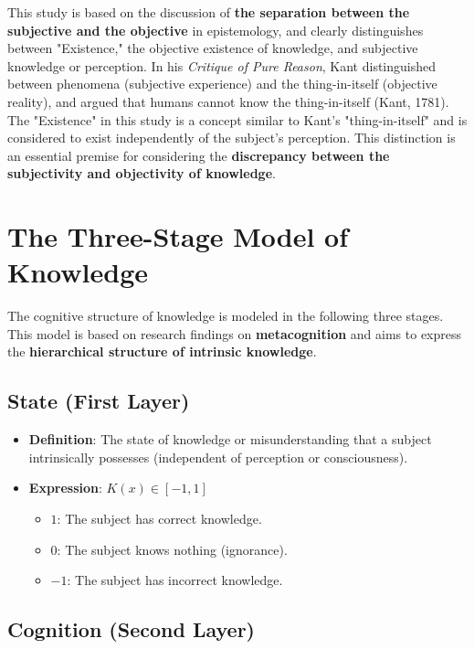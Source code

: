 \documentclass{article}
\begin{document}
This study is based on the discussion of \textbf{the separation between the subjective and the objective} in epistemology, and clearly distinguishes between "Existence," the objective existence of knowledge, and subjective knowledge or perception. In his \textit{Critique of Pure Reason}, Kant distinguished between phenomena (subjective experience) and the thing-in-itself (objective reality), and argued that humans cannot know the thing-in-itself (Kant, 1781). The "Existence" in this study is a concept similar to Kant's "thing-in-itself" and is considered to exist independently of the subject's perception. This distinction is an essential premise for considering the \textbf{discrepancy between the subjectivity and objectivity of knowledge}.

\section{The Three-Stage Model of Knowledge}

The cognitive structure of knowledge is modeled in the following three stages. This model is based on research findings on \textbf{metacognition} and aims to express the \textbf{hierarchical structure of intrinsic knowledge}.

\subsection{State (First Layer)}

\begin{itemize}
    \item \textbf{Definition}: The state of knowledge or misunderstanding that a subject intrinsically possesses (independent of perception or consciousness).
    \item \textbf{Expression}: \( K(x) \in [-1, 1] \)
        \begin{itemize}
            \item \( 1 \): The subject has correct knowledge.
            \item \( 0 \): The subject knows nothing (ignorance).
            \item \(-1 \): The subject has incorrect knowledge.
        \end{itemize}
\end{itemize}

\subsection{Cognition (Second Layer)}
\end{document}
